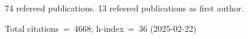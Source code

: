 74 refereed publications. 13 refeered publications as first author.

Total citations~=~4668; h-index~=~36 (2025-02-22)